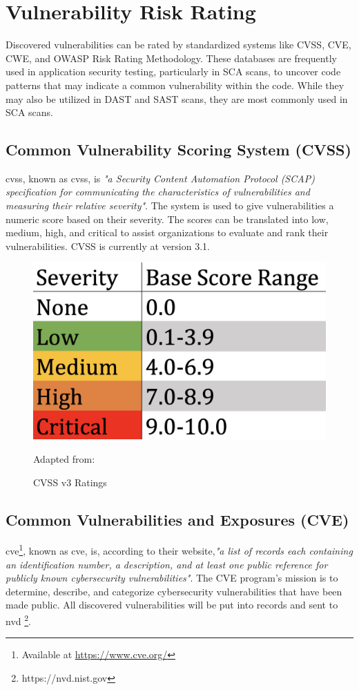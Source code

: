 \section{Vulnerability Risk Rating}
Discovered vulnerabilities can be rated by standardized systems like CVSS, CVE, CWE, and OWASP Risk Rating Methodology. These databases are frequently used in application security testing, particularly in SCA scans, to uncover code patterns that may indicate a common vulnerability within the code. While they may also be utilized in DAST and SAST scans, they are most commonly used in SCA scans. 

\subsection{Common Vulnerability Scoring System (CVSS)}
\acrlong{cvss}, known as \acrshort{cvss}, is \textit{"a Security Content Automation Protocol (SCAP) specification for communicating the characteristics of vulnerabilities and measuring their relative severity"}\cite{nistCVSS}. The system is used to give vulnerabilities a numeric score based on their severity. The scores can be translated into low, medium, high, and critical to assist organizations to evaluate and rank their vulnerabilities. CVSS is currently at version 3.1. \cite{CVSS}
\begin{figure}[H]
    \centering
    \includegraphics[scale=0.3]{Images/CVSS.png}
    \caption{CVSS v3 Ratings} Adapted from:\cite{cvssrating}
    \label{fig:CVSS v3 Ratings}
\end{figure}


\subsection{Common Vulnerabilities and Exposures (CVE)}
\acrlong{cve}\footnote{Available at \url{https://www.cve.org/}}, known as \acrshort{cve}, is, according to their website,\textit{"a list of records each containing an identification number, a description, and at least one public reference for publicly known cybersecurity vulnerabilities"}\cite{CVE}. The CVE program's mission is to determine, describe, and categorize cybersecurity vulnerabilities that have been made public. All discovered vulnerabilities will be put into records and sent to \acrlong{nvd} \footnote{https://nvd.nist.gov}.

